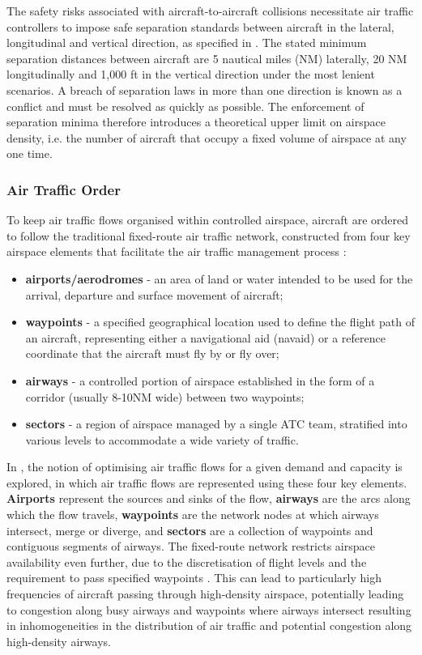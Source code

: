 The safety risks associated with aircraft-to-aircraft collisions necessitate air traffic controllers to impose safe separation standards between aircraft in the lateral, longitudinal and vertical direction, as specified in \cite{ICAOPANSDoc44442016}. The stated minimum separation distances between aircraft are 5 nautical miles (NM) laterally, 20 NM longitudinally and 1,000 ft in the vertical direction under the most lenient scenarios. A breach of separation laws in more than one direction is known as a conflict and must be resolved as quickly as possible. The enforcement of separation minima therefore introduces a theoretical upper limit on airspace density, i.e. the number of aircraft that occupy a fixed volume of airspace at any one time. 

\subsubsection{Air Traffic Order} 
To keep air traffic flows organised within controlled airspace, aircraft are ordered to follow the traditional fixed-route air traffic network, constructed from four key airspace elements that facilitate the air traffic management process \cite{SecretariatGeneral2016}:

\begin{itemize}
\item \textbf{airports/aerodromes} - an area of land or water intended to be used for the arrival, departure and surface movement of aircraft;
\item \textbf{waypoints} - a specified geographical location used to define the flight path of an aircraft, representing either a navigational aid (navaid) or a reference coordinate that the aircraft must fly by or fly over;
\item \textbf{airways} - a controlled portion of airspace established in the form of a corridor (usually 8-10NM wide) between two waypoints;
\item \textbf{sectors} - a region of airspace managed by a single ATC team, stratified into various levels to accommodate a wide variety of traffic.
\end{itemize}

In \cite{Odoni1987}, the notion of optimising air traffic flows for a given demand and capacity is explored, in which air traffic flows are represented using these four key elements. \textbf{Airports} represent the sources and sinks of the flow, \textbf{airways} are the arcs along which the flow travels, \textbf{waypoints} are the network nodes at which airways intersect, merge or diverge, and \textbf{sectors} are a collection of waypoints and contiguous segments of airways. The fixed-route network restricts airspace availability even further, due to the discretisation of flight levels and the requirement to pass specified waypoints \cite{Bilimoria1996, FAA2017}. This can lead to particularly high frequencies of aircraft passing through high-density airspace, potentially leading to congestion along busy airways and waypoints where airways intersect resulting in inhomogeneities in the distribution of air traffic and potential congestion along high-density airways.

